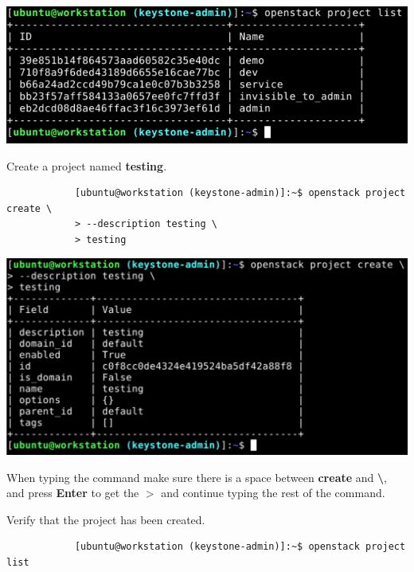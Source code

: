\documentclass[letterpaper, 12pt]{article}
\begin{document}
\begin{enumerate}
\begin{labstep}
        \begin{center}
            \includegraphics[width=\linewidth]{images/part2/step3.png}
        \end{center}
    \end{labstep}

    \begin{labstep}
        Create a project named \textbf{testing}.
        \begin{lstlisting}
            [ubuntu@workstation (keystone-admin)]:~$ openstack project create \
            > --description testing \
            > testing
        \end{lstlisting}

        \begin{center}
            \includegraphics[width=\linewidth]{images/part2/step4.png}
        \end{center}
    \end{labstep}

    \begin{tipbox}
        When typing the command make sure there is a space between \textbf{create} and \textbf{\textbackslash}, and press \textbf{Enter} to get the \textbf{$>$} and continue typing the rest of the command.
    \end{tipbox}

    \begin{labstep}
        Verify that the project has been created.
        \begin{lstlisting}
            [ubuntu@workstation (keystone-admin)]:~$ openstack project list
        \end{lstlisting}


\end{labstep}
\end{enumerate}
\end{document}
